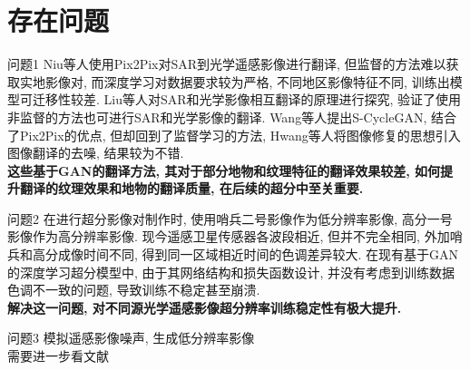 \section{存在问题}

\begin{frame}{问题1}
    Niu等人使用Pix2Pix对SAR到光学遥感影像进行翻译, 但监督的方法难以获取实地影像对, 而深度学习对数据要求较为严格, 不同地区影像特征不同, 训练出模型可迁移性较差. Liu等人对SAR和光学影像相互翻译的原理进行探究, 验证了使用非监督的方法也可进行SAR和光学影像的翻译. Wang等人提出S-CycleGAN, 结合了Pix2Pix的优点, 但却回到了监督学习的方法, Hwang等人将图像修复的思想引入图像翻译的去噪, 结果较为不错. 
    \\[0.5cm]
    \textbf{这些基于GAN的翻译方法, 其对于部分地物和纹理特征的翻译效果较差, 如何提升翻译的纹理效果和地物的翻译质量, 在后续的超分中至关重要.}
     
 \end{frame}

 \begin{frame}{问题2}
    在进行超分影像对制作时, 使用哨兵二号影像作为低分辨率影像, 高分一号影像作为高分辨率影像. 现今遥感卫星传感器各波段相近, 但并不完全相同, 外加哨兵和高分成像时间不同, 得到同一区域相近时间的色调差异较大. 在现有基于GAN的深度学习超分模型中, 由于其网络结构和损失函数设计, 并没有考虑到训练数据色调不一致的问题, 导致训练不稳定甚至崩溃. 
    \\[0.5cm]
    \textbf{解决这一问题, 对不同源光学遥感影像超分辨率训练稳定性有极大提升.}

 \end{frame}

 \begin{frame}{问题3}
    模拟遥感影像噪声, 生成低分辨率影像
    \\[0.5cm]
    需要进一步看文献
 \end{frame}